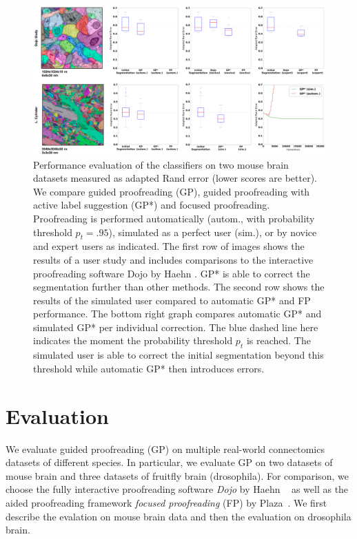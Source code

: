 \begin{figure}[t]
\begin{center}
\includegraphics[width=\linewidth]{gfx/results_mouse.png}
\end{center}
  \vspace{-4mm}
   \caption{Performance evaluation of the classifiers on two mouse brain datasets measured as adapted Rand error (lower scores are better). We compare guided proofreading (GP), guided proofreading with active label suggestion (GP*) and focused proofreading. Proofreading is performed automatically (autom., with probability threshold $p_t=.95$), simulated as a perfect user (sim.), or by novice and expert users as indicated. The first row of images shows the results of a user study and includes comparisons to the interactive proofreading software Dojo by Haehn \etal \cite{haehn_dojo_2014}. GP* is able to correct the segmentation further than other methods. The second row shows the results of the simulated user compared to automatic GP* and FP performance. The bottom right graph compares automatic GP* and simulated GP* per individual correction. The blue dashed line here indicates the moment the probability threshold $p_t$ is reached. The simulated user is able to correct the initial segmentation beyond this threshold while automatic GP* then introduces errors.}
\label{fig:results_mouse}
\end{figure}

\section{Evaluation}
\label{sec:evaluation}

We evaluate guided proofreading (GP) on multiple real-world connectomics datasets of different species. In particular, we evaluate GP on two datasets of mouse brain and three datasets of fruitfly brain (drosophila). For comparison, we choose the fully interactive proofreading software \textit{Dojo} by Haehn \etal~\cite{haehn_dojo_2014} as well as the aided proofreading framework \textit{focused proofreading} (FP) by Plaza~\cite{focused_proofreading}. We first describe the evalation on mouse brain data and then the evaluation on drosophila brain.



